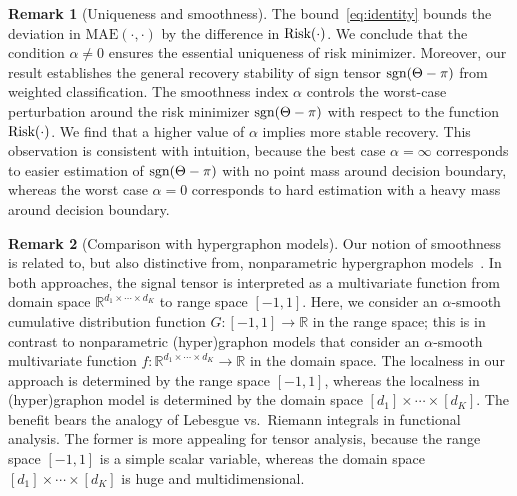 \documentclass[twoside,11pt]{article}
\theoremstyle{definition}
\newtheorem{rmk}{Remark}
\def\sign{\textup{sgn}}
\begin{document}
\begin{rmk}[Uniqueness and smoothness]
The bound~\eqref{eq:identity} bounds the deviation in $\text{MAE}(\cdot,\cdot)$ by the difference in $\textup{Risk}(\cdot)$. We conclude that the condition $\alpha\neq 0$ ensures the essential uniqueness of risk minimizer. Moreover, our result establishes the general recovery stability of sign tensor $\sign(\Theta-\pi)$ from weighted classification. The smoothness index $\alpha$ controls the worst-case perturbation around the risk minimizer $\sign(\Theta-\pi)$ with respect to the function $\textup{Risk}(\cdot)$. We find that a higher value of $\alpha$ implies more stable recovery.  This observation is consistent with intuition, because the best case $\alpha=\infty$ corresponds to easier estimation of $\sign(\Theta-\pi)$ with no point mass around decision boundary, whereas the worst case $\alpha = 0$ corresponds to hard estimation with a heavy mass around decision boundary. 

\end{rmk}


\begin{rmk}[Comparison with hypergraphon models]\label{rmk:graphon}
Our notion of smoothness is related to, but also distinctive from, nonparametric hypergraphon models~\citep{xu2018rates,balasubramanian2021nonparametric}. In both approaches, the signal tensor is interpreted as a multivariate function from domain space $\mathbb{R}^{d_1\times \cdots \times d_K}$ to range space $[-1,1]$. Here, we consider an $\alpha$-smooth cumulative distribution function $G\colon[-1,1]\rightarrow\mathbb{R}$ in the range space; this is in contrast to nonparametric (hyper)graphon models that consider an $\alpha$-smooth multivariate function $f\colon \mathbb{R}^{d_1\times \cdots \times d_K}\rightarrow \mathbb{R}$ in the domain space. The localness in our approach is determined by the range space $[-1,1]$,  whereas the localness in (hyper)graphon model is determined by the domain space $[d_1]\times \cdots \times [d_K]$. The benefit bears the analogy of Lebesgue vs.\ Riemann integrals in functional analysis. The former is more appealing for tensor analysis, because the range space $[-1,1]$ is a simple scalar variable, whereas the domain space $[d_1]\times \cdots \times [d_K]$ is huge and multidimensional. 
\end{rmk}
\end{document}
